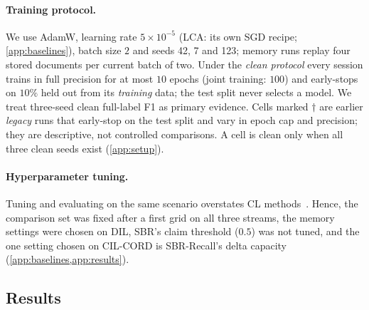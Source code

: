 \documentclass[10pt,twocolumn,letterpaper]{article}
\begin{document}
\paragraph{Training protocol.}\label{sec:protocol} We use AdamW, learning rate $5{\times}10^{-5}$ (LCA: its own SGD recipe; \cref{app:baselines}), batch size $2$ and seeds 42, 7 and 123; memory runs replay four stored documents per current batch of two. Under the \emph{clean protocol} every session trains in full precision for at most $10$ epochs (joint training: $100$) and early-stops on $10\%$ held out from its \emph{training} data; the test split never selects a model. We treat three-seed clean full-label F1 as primary evidence. Cells marked $\dagger$ are earlier \emph{legacy} runs that early-stop on the test split and vary in epoch cap and precision; they are descriptive, not controlled comparisons. A cell is clean only when all three clean seeds exist (\cref{app:setup}).

\paragraph{Hyperparameter tuning.} Tuning and evaluating on the same scenario overstates CL methods~\citep{cha2025hyperparameters}. Hence, the comparison set was fixed after a first grid on all three streams, the memory settings were chosen on DIL, SBR's claim threshold ($0.5$) was not tuned, and the one setting chosen on CIL-CORD is SBR-Recall's delta capacity (\cref{app:baselines,app:results}).

\begin{table}[t]
\centering\small
\setlength{\tabcolsep}{4pt}
\caption{\textbf{Evidence across streams} on LayoutLMv3. F1: full-label F1; AA and AF: average accuracy and forgetting (\cref{sec:setup}). Clean three-seed F1 on CIL-CORD is the primary comparison; other clean proposed rows test transfer. AA and F1: mean $\pm$ s.d. over three seeds, per-seed values when fewer; AF: mean; ``--'': not run. $^\dagger$legacy protocol: contextual only, not ranked against clean rows. $^{n=k}$: $k$ clean seeds so far; $^{c}$one fp16 LwF seed that collapsed to all-background is excluded; $^{b}$with the $50$-document memory; $^{p}$made before we fixed our port's orthogonality penalty. Ports and protocols: \cref{app:baselines}; what each method stores: \cref{tab:memcmp}.}
\label{tab:main}
\resizebox{\linewidth}{!}{}
\end{table}

\subsection{Results}
\label{sec:beyond}
\end{document}
